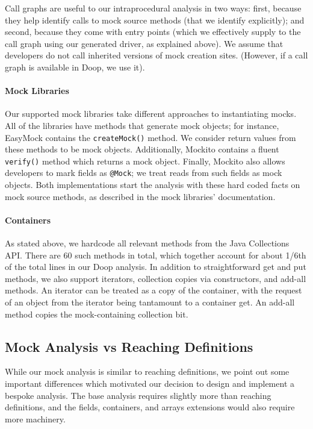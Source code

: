 Call graphs are useful to our intraprocedural analysis in two ways: first, because they help identify calls to mock source methods (that we identify explicitly); and second, because they come with entry points (which we effectively supply to the call graph using our generated driver, as explained above). We assume that developers do not call inherited versions of mock creation sites. (However, if a call graph is available in Doop, we use it). 

\paragraph{Mock Libraries}
Our supported mock libraries take different approaches to instantiating mocks. All of the libraries have methods that generate mock objects; for instance, EasyMock contains the \texttt{createMock()} method. We consider return values from these methods to be mock objects. Additionally, Mockito contains a fluent \texttt{verify()} method which returns a mock object. Finally, Mockito also allows developers to mark fields as \texttt{@Mock}; we treat reads from such fields as mock objects. Both implementations start the analysis with these hard coded facts on mock source methods, as described in the mock libraries' documentation.

\paragraph{Containers} 
As stated above, we hardcode all relevant methods from the Java Collections API. There are 60 such methods in total, which together account for about 1/6th of the total lines in our Doop analysis. In addition to straightforward get and put methods, we also support iterators, collection copies via constructors, and add-all methods. An iterator can be treated as a copy of the container, with the request of an object from the iterator being tantamount to a container get. An add-all method copies the mock-containing collection bit.

\subsection{Mock Analysis vs Reaching Definitions}
While our mock analysis is similar to reaching definitions, we point out some important differences which motivated our decision to design and implement a bespoke analysis. The base analysis requires slightly more than reaching definitions, and the fields, containers, and arrays extensions would also require more machinery.

